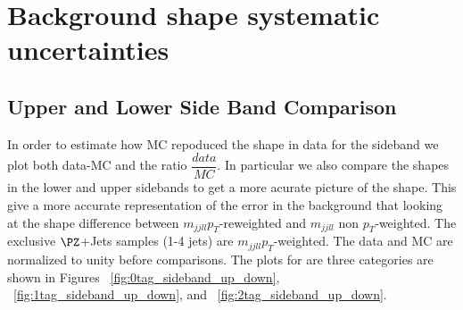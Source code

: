 \section{Background shape systematic uncertainties}



\subsection{Upper and Lower Side Band Comparison}

In order to estimate how MC repoduced the shape in data for the sideband we plot both data-MC and the ratio $\dfrac{data}{MC}$.  In particular we also compare
the shapes in the lower and upper sidebands to get a more acurate picture of the shape.  This give a more accurate representation of the error in the
background that looking at the shape difference between $m_{jjll} p_{T}$-reweighted and $m_{jjll}$ non $p_{T}$-weighted. The exclusive $\PZ$+Jets samples (1-4 jets)
are $m_{jjll} p_{T}$-weighted.  The data and MC are normalized to unity before comparisons. The plots for are three categories are
shown in Figures ~\ref{fig:0tag_sideband_up_down}, ~\ref{fig:1tag_sideband_up_down}, and ~\ref{fig:2tag_sideband_up_down}.  

